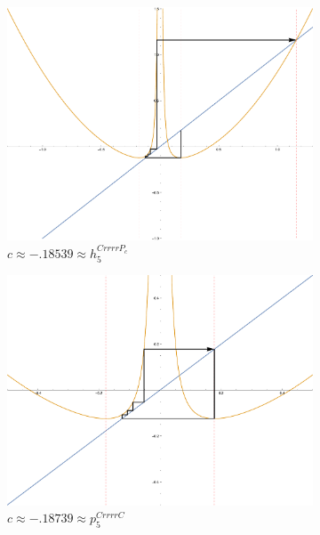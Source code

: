 \begin{figure}[ht]
		\begin{subfigure}[b]{0.3\textwidth}
				\includegraphics[width=\textwidth]{./img/plot-018539}
				\caption{$c \approx -.18539 \approx h_5^{CrrrrP_c}$}
		\end{subfigure}
		\begin{subfigure}[b]{0.3\textwidth}
				\includegraphics[width=\textwidth]{./img/plot-018739}
				\caption{$c \approx - .18739\approx p_5^{CrrrrC}$}
		\end{subfigure}
		\begin{subfigure}[b]{0.3\textwidth}

\end{subfigure}
\end{figure}

